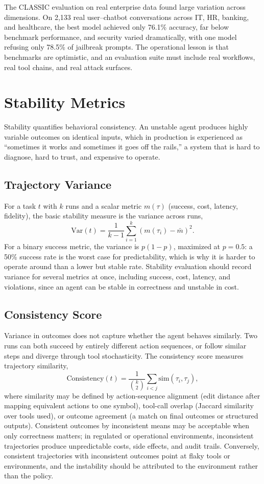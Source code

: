 \documentclass[11pt]{book}
\begin{document}
The CLASSIC evaluation on real enterprise data \cite{classic2025} found large variation across dimensions. On 2{,}133 real user--chatbot conversations across IT, HR, banking, and healthcare, the best model achieved only 76.1\% accuracy, far below benchmark performance, and security varied dramatically, with one model refusing only 78.5\% of jailbreak prompts. The operational lesson is that benchmarks are optimistic, and an evaluation suite must include real workflows, real tool chains, and real attack surfaces.

\section{Stability Metrics}

Stability quantifies behavioral consistency. An unstable agent produces highly variable outcomes on identical inputs, which in production is experienced as ``sometimes it works and sometimes it goes off the rails,'' a system that is hard to diagnose, hard to trust, and expensive to operate.

\subsection{Trajectory Variance}

For a task $t$ with $k$ runs and a scalar metric $m(\tau)$ (success, cost, latency, fidelity), the basic stability measure is the variance across runs,
\[
\text{Var}(t) = \frac{1}{k-1} \sum_{i=1}^{k} (m(\tau_i) - \bar{m})^2.
\]
For a binary success metric, the variance is $p(1-p)$, maximized at $p = 0.5$: a 50\% success rate is the worst case for predictability, which is why it is harder to operate around than a lower but stable rate. Stability evaluation should record variance for several metrics at once, including success, cost, latency, and violations, since an agent can be stable in correctness and unstable in cost.

\subsection{Consistency Score}

Variance in outcomes does not capture whether the agent behaves similarly. Two runs can both succeed by entirely different action sequences, or follow similar steps and diverge through tool stochasticity. The consistency score measures trajectory similarity,
\[
\text{Consistency}(t) = \frac{1}{\binom{k}{2}} \sum_{i < j} \text{sim}(\tau_i, \tau_j),
\]
where similarity may be defined by action-sequence alignment (edit distance after mapping equivalent actions to one symbol), tool-call overlap (Jaccard similarity over tools used), or outcome agreement (a match on final outcomes or structured outputs). Consistent outcomes by inconsistent means may be acceptable when only correctness matters; in regulated or operational environments, inconsistent trajectories produce unpredictable costs, side effects, and audit trails. Conversely, consistent trajectories with inconsistent outcomes point at flaky tools or environments, and the instability should be attributed to the environment rather than the policy.
\end{document}
